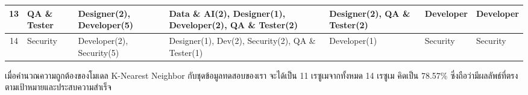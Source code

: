 \begin{table}[H]
\begin{tabularx}{\textwidth}{|c|>{\raggedright\arraybackslash}X|>{\raggedright\arraybackslash}X|>{\raggedright\arraybackslash}X|>{\raggedright\arraybackslash}X|>{\raggedright\arraybackslash}X|>{\raggedright\arraybackslash}X|}
        13                    & QA \& Tester                   & Designer(2), Developer(5)                        & Data \& AI(2), Designer(1), Developer(2), QA \& Tester(2) & Designer(2), QA \& Tester(2)       & Developer                        & Developer                              \\ \hline
        14                    & Security                       & Developer(2), Security(5)                        & Designer(1), Dev(2), Security(2), \newline QA \& Tester(1)         & Developer(1)                       & Security                         & Security                               \\ \hline
    \end{tabularx}
\end{table}
เมื่อคำนวณความถูกต้องของโมเดล K-Nearest Neighbor กับชุดข้อมูลทดสอบของเรา จะได้เป็น 11 เรซูเมจากทั้งหมด 14 เรซูเม คิดเป็น 78.57\% ซึ่งถือว่ามีผลลัพธ์ที่ตรงตามเป้าหมายและประสบความสำเร็จ